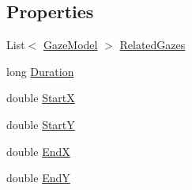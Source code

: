 \subsection*{Properties}
\begin{DoxyCompactItemize}
\item 
List$<$ \hyperlink{class_web_analyzer_1_1_models_1_1_data_model_1_1_gaze_model}{Gaze\+Model} $>$ \hyperlink{class_web_analyzer_1_1_models_1_1_analysis_model_1_1_fixation_model_a478001ceab5fb747d7d33cbd81382932}{Related\+Gazes}
\item 
long \hyperlink{class_web_analyzer_1_1_models_1_1_analysis_model_1_1_fixation_model_a045eca17df1de4d293b5d38b1c812040}{Duration}
\item 
double \hyperlink{class_web_analyzer_1_1_models_1_1_analysis_model_1_1_fixation_model_af8b292c9e9e04c3b1b1c617fe3a44e06}{Start\+X}
\item 
double \hyperlink{class_web_analyzer_1_1_models_1_1_analysis_model_1_1_fixation_model_a187714460ee0851def122bd776fbda91}{Start\+Y}
\item 
double \hyperlink{class_web_analyzer_1_1_models_1_1_analysis_model_1_1_fixation_model_a0b77bda45070dad7347eaa90daf29247}{End\+X}
\item 
double \hyperlink{class_web_analyzer_1_1_models_1_1_analysis_model_1_1_fixation_model_a431705c50a74006b786fbcf7e357567f}{End\+Y}
\end{DoxyCompactItemize}
